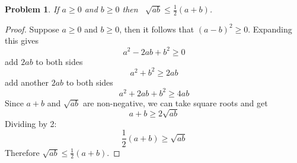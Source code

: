 \documentclass[12pt]{article}
\newtheorem{problem}{Problem}
\begin{document}
\begin{problem} %
If $a\ge 0$ and $b\ge 0$ then \, $\displaystyle \sqrt{ab} \le \frac{1}{2}\left(a+b\right)$.
\end{problem}


\begin{proof}
	Suppose $a \geq 0$ and $b \geq 0$, then it follows that $(a-b)^2 \geq 0$. Expanding this gives
	$$
		a^2 -2ab + b^2 \geq 0
	$$
	add $2ab$ to both sides
	$$
	a^2 + b^2 \geq 2ab
	$$
add another $2ab$ to both sides
$$
a^2 + 2ab + b^2 \geq 4ab
$$
Since $a+b$ and $\sqrt{ab}$ are non-negative, we can take square roots and get
$$ a + b \geq 2\sqrt{ab}$$
Dividing by 2:
$$ \frac{1}{2}(a + b) \geq \sqrt{ab} $$
Therefore  $\displaystyle \sqrt{ab} \le \frac{1}{2}\left(a+b\right)$.
\end{proof}
\end{document}
